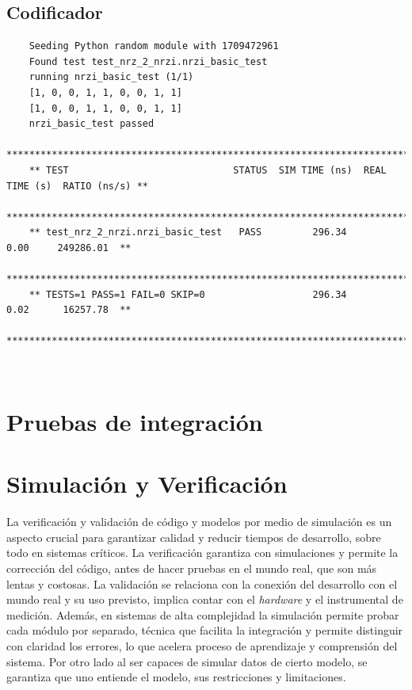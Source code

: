 \subsection{Codificador}

  {\scriptsize\begin{verbatim}
    Seeding Python random module with 1709472961
    Found test test_nrz_2_nrzi.nrzi_basic_test
    running nrzi_basic_test (1/1)
    [1, 0, 0, 1, 1, 0, 0, 1, 1]
    [1, 0, 0, 1, 1, 0, 0, 1, 1]
    nrzi_basic_test passed
    *****************************************************************************************
    ** TEST                             STATUS  SIM TIME (ns)  REAL TIME (s)  RATIO (ns/s) **
    *****************************************************************************************
    ** test_nrz_2_nrzi.nrzi_basic_test   PASS         296.34           0.00     249286.01  **
    *****************************************************************************************
    ** TESTS=1 PASS=1 FAIL=0 SKIP=0                   296.34           0.02      16257.78  **
    *****************************************************************************************
  \end{verbatim}}



{\scriptsize\begin{verbatim}
  
\end{verbatim}}

\section{Pruebas de integración}

\section{Simulación y Verificación}

La verificación y validación de código y modelos por medio de simulación es
un aspecto crucial para garantizar calidad y reducir tiempos de desarrollo,
sobre todo en sistemas críticos. La verificación garantiza con simulaciones y
permite la corrección del código, antes de hacer pruebas en el mundo real, que
son más lentas y costosas. La validación se relaciona con la conexión del
desarrollo con el mundo real y su uso previsto, implica contar con el
\textit{hardware} y el instrumental de medición. Además, en sistemas de alta
complejidad la simulación permite probar cada módulo por separado, técnica que
facilita la integración y permite distinguir con claridad los errores, lo que
acelera proceso de aprendizaje y comprensión del sistema. Por otro lado al ser
capaces de simular datos de cierto modelo, se garantiza que uno entiende el
modelo, sus restricciones y limitaciones.

